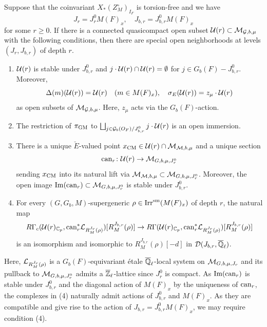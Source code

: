 \documentclass[12pt,reqno]{amsart}
\begin{document}
\begin{prop} \label{prop:restatement_LSV}
    Suppose that the coinvariant $X_*(Z_M^\circ)_{I_F}$ is torsion-free and we have
    \[
        J_r = J_r^0 M(F)_x ,\quad J_{b, r} = J_{b, r}^0 M(F)_x
    \]
    for some $r \geq 0$. If there is a connected quasicompact open subset 
    $
        {\mathcal{U}}(r) \subset {\mathcal{M}}_{{\mathcal{G}}, b, \mu}
    $
    with the following conditions, then there are special open neighborhoods at levels $(J_r, J_{b, r})$ of depth $r$. 
    \begin{enumerate}
        \item ${\mathcal{U}}(r)$ is stable under $J^0_{b, r}$ and $j \cdot {\mathcal{U}}(r) \cap {\mathcal{U}}(r) = \emptyset$ for $j \in G_b(F) - J_{b, r}^0$. Moreover, 
        \[
            \Delta(m)({\mathcal{U}}(r)) = {\mathcal{U}}(r) \quad (m \in M(F)_x) ,\quad
            \sigma_E({\mathcal{U}}(r)) = z_\mu \cdot {\mathcal{U}}(r)
        \]
        as open subsets of ${\mathcal{M}}_{{\mathcal{G}}, b, \mu}$. Here, $z_\mu$ acts via the $G_b(F)$-action. 
        \item The restriction of $\pi_{\operatorname{GM}}$ to $\bigsqcup_{j \in {\mathcal{G}}_b(O_F) / J^0_{b, r}} j \cdot {\mathcal{U}}(r)$ is an open immersion. 
        \item There is a unique $\breve{E}$-valued point $x_{\operatorname{CM}} \in {\mathcal{U}}(r) \cap {\mathcal{M}}_{{\mathcal{M}}, b, \mu}$ and a unique section
        \[
            {\operatorname{can}}_r \colon {\mathcal{U}}(r) \to {\mathcal{M}}_{G, b, \mu, J^0_r}
        \]
        sending $x_{\operatorname{CM}}$ into its natural lift via ${\mathcal{M}}_{{\mathcal{M}}, b, \mu} \subset {\mathcal{M}}_{G, b, \mu, J^0_r}$. Moreover, the open image ${\operatorname{Im}}({\operatorname{can}}_r) \subset {\mathcal{M}}_{G, b, \mu, J^0_r}$ is stable under $J_{b, r}^0$. 
        \item For every $(G, G_b, M)$-supergeneric $\rho \in {\operatorname{Irr}}^{\operatorname{sm}}(M(F)_x)$ of depth $r$, the natural map
        \begin{equation} \label{eq:map_from_compact_to_usual}
            R\Gamma_c({\mathcal{U}}(r)_{\mathbb{C}_p}, {\operatorname{can}}_r^*{\mathcal{L}}_{R^{J_r}_M(\rho)})[R^{J_{b, r}}_M(\rho)] \to R\Gamma({\mathcal{U}}(r)_{\mathbb{C}_p}, {\operatorname{can}}_r^*{\mathcal{L}}_{R^{J_r}_M(\rho)})[R^{J_{b, r}}_M(\rho)]
        \end{equation}
        is an isomorphism and isomorphic to $R^{J_{b, r}}_M(\rho)[-d]$ in ${\mathcal{D}}(J_{b, r}, {\overline{\mathbb{Q}}_\ell})$. 
    \end{enumerate}
\end{prop}

Here, ${\mathcal{L}}_{R_M^{J_r}(\rho)}$ is a $G_b(F)$-equivariant \'{e}tale ${\overline{\mathbb{Q}}_\ell}$-local system on ${\mathcal{M}}_{G, b, \mu, J_r}$ and its pullback to ${\mathcal{M}}_{G, b, \mu, J^0_r}$ admits a $\mathbb{{\overline{Z}}}_\ell$-lattice since $J_r^0$ is compact. As ${\operatorname{Im}}({\operatorname{can}}_r)$ is stable under $J_{b, r}^0$ and the diagonal action of $M(F)_x$ by the uniqueness of ${\operatorname{can}}_r$, the complexes in (4) naturally admit actions of $J_{b, r}^0$ and $M(F)_x$. As they are compatible and give rise to the action of $J_{b, r} = J_{b, r}^0 M(F)_x$, we may require condition (4). 
\end{document}
